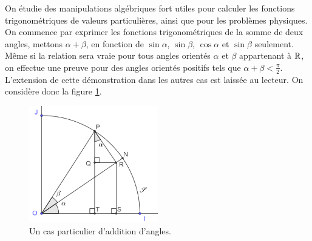 		On étudie des manipulations algébriques fort utiles pour calculer les fonctions trigonométriques de valeurs particulières, ainsi que pour les problèmes physiques. On commence par exprimer les fonctions trigonométriques de la somme de deux angles, mettons $\alpha+\beta$, en fonction de $\sin\alpha$, $\sin\beta$, $\cos\alpha$ et $\sin\beta$ seulement. Même si la relation sera vraie pour tous angles orientés $\alpha$ et $\beta$ appartenant à $\mathbb{R}$, on effectue une preuve pour des angles orientés positifs tels que $\alpha+\beta<\frac{\pi}{2}$. L'extension de cette démonstration dans les autres cas est laissée au lecteur. On considère donc la figure \ref{fig_sin_add}.

		\begin{figure}
			\includegraphics[width=0.5\textwidth]{image/fct_trigo/sin_addition.png} 
			\caption{Un cas particulier d'addition d'angles.}
			\label{fig_sin_add}
		\end{figure}
		


